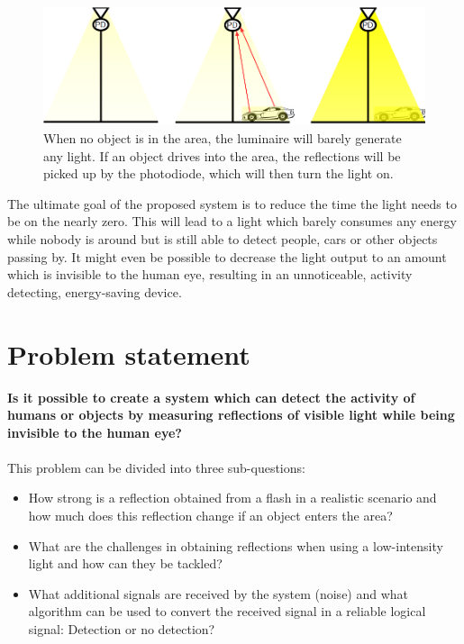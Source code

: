\begin{figure}[]
	\centering     %
	\includegraphics[width=120mm]{pics/SystemScenario.png}
	\caption{When no object is in the area, the luminaire will barely generate any light. If an object drives into the area, the reflections will be picked up by the photodiode, which will then turn the light on. \label{fig:Introduction}}
\end{figure}
The ultimate goal of the proposed system is to reduce the time the light needs to be on the nearly zero. This will lead to a light which barely consumes any energy while nobody is around but is still able to detect people, cars or other objects passing by. It might even be possible to decrease the light output to an amount which is invisible to the human eye, resulting in an unnoticeable, activity detecting, energy-saving device.

\section{Problem statement}
\label{Problem statement}
\textbf{Is it possible to create a system which can detect the activity of humans or objects by measuring reflections of visible light while being invisible to the human eye?}
\\
\\
This problem can be divided into three sub-questions:
\begin{itemize}\itemsep2pt
	\item How strong is a reflection obtained from a flash in a realistic scenario and how much does this reflection change if an object enters the area?
	\item What are the challenges in obtaining reflections when using a low-intensity light and how can they be tackled?
	\item What additional signals are received by the system (noise) and what algorithm can be used to convert the received signal in a reliable logical signal: Detection or no detection?
\end{itemize}

